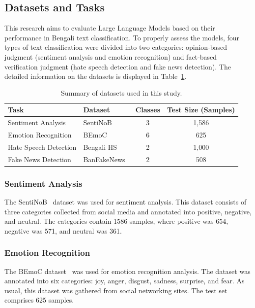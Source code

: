 \documentclass[10pt,letterpaper]{article}
\begin{document}
\subsection*{Datasets and Tasks}
This research aims to evaluate Large Language Models based on their performance in Bengali text classification. To properly assess the models, four types of text classification were divided into two categories: opinion-based judgment (sentiment analysis and emotion recognition) and fact-based verification judgment (hate speech detection and fake news detection). The detailed information on the datasets is displayed in Table~\ref{tab:datasets}.

\begin{table}[!t]
\centering
\small
\caption{Summary of datasets used in this study.}
\label{tab:datasets}
\renewcommand{\arraystretch}{1.2}
\setlength{\tabcolsep}{6pt}
\begin{tabularx}{\columnwidth}{|l|X|c|c|}
\hline
\textbf{Task} & \textbf{Dataset} & \textbf{Classes} & \textbf{Test Size (Samples)} \\\hline
Sentiment Analysis & SentiNoB~\cite{b31} & 3 & 1,586 \\\hline
Emotion Recognition & BEmoC~\cite{b32} & 6 & 625 \\\hline
Hate Speech Detection & Bengali HS~\cite{b33} & 2 & 1,000 \\\hline
Fake News Detection & BanFakeNews~\cite{b34} & 2 & 508 \\\hline
\end{tabularx}
\end{table}



\subsubsection*{Sentiment Analysis}
The SentiNoB~\cite{b31} dataset was used for sentiment analysis. This dataset consists of three categories collected from social media and annotated into positive, negative, and neutral. The categories contain 1586 samples, where positive was 654, negative was 571, and neutral was 361.

\subsubsection*{Emotion Recognition}
The BEmoC dataset~\cite{b32} was used for emotion recognition analysis. The dataset was annotated into six categories: joy, anger, disgust, sadness, surprise, and fear. As usual, this dataset was gathered from social networking sites. The test set comprises 625 samples.
\end{document}
